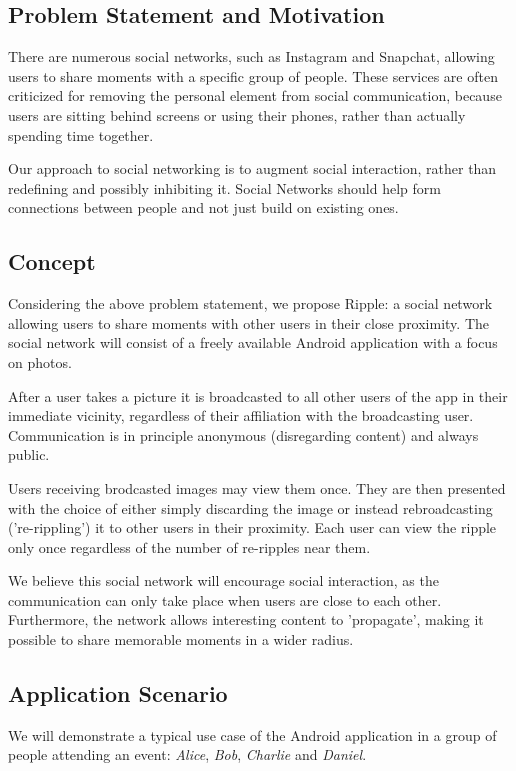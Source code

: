 \documentclass{report}
\begin{document}
\subsection{Problem Statement and Motivation}
There are numerous social networks, such as Instagram and Snapchat, allowing users to share moments with a specific group of people.
These services are often criticized for removing the personal element from social communication, because users are sitting behind screens or using their phones, rather than actually spending time together.

Our approach to social networking is to augment social interaction, rather than redefining and possibly inhibiting it. Social Networks should help form connections between people and not just build on existing ones.

\subsection{Concept}
Considering the above problem statement, we propose Ripple: a social network allowing users to share moments with other users in their close proximity. The social network will consist of a freely available Android application with a focus on photos.

After a user takes a picture it is broadcasted to all other users of the app in their immediate vicinity, regardless of their affiliation with the broadcasting user. Communication is in principle anonymous (disregarding content) and always public.

Users receiving brodcasted images may view them once. They are then presented with the choice of either simply discarding the image or instead rebroadcasting ('re-rippling') it to other users in their proximity.
Each user can view the ripple only once regardless of the number of re-ripples near them.

We believe this social network will encourage social interaction, as the communication can only take place when users are close to each other. Furthermore, the network allows interesting content to 'propagate', making it possible to share memorable moments in a wider radius.

\subsection{Application Scenario}
We will demonstrate a typical use case of the Android application in a group of people attending an event: \textit{Alice}, \textit{Bob}, \textit{Charlie} and \textit{Daniel}.
\end{document}
